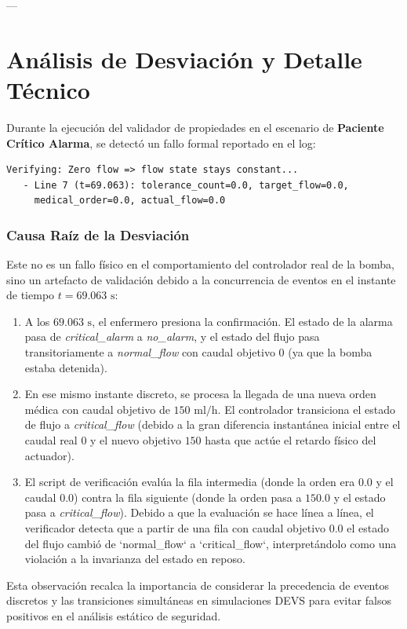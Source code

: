 \documentclass[11pt,a4paper]{article}
\begin{document}
---

\section{Análisis de Desviación y Detalle Técnico}
\label{sec:analisis_falla}
Durante la ejecución del validador de propiedades en el escenario de \textbf{Paciente Crítico Alarma}, se detectó un fallo formal reportado en el log:
\begin{verbatim}
Verifying: Zero flow => flow state stays constant...
   - Line 7 (t=69.063): tolerance_count=0.0, target_flow=0.0, 
     medical_order=0.0, actual_flow=0.0
\end{verbatim}

\subsubsection{Causa Raíz de la Desviación}
Este no es un fallo físico en el comportamiento del controlador real de la bomba, sino un artefacto de validación debido a la concurrencia de eventos en el instante de tiempo $t = 69.063\text{ s}$:
\begin{enumerate}
    \item A los $69.063\text{ s}$, el enfermero presiona la confirmación. El estado de la alarma pasa de \textit{critical\_alarm} a \textit{no\_alarm}, y el estado del flujo pasa transitoriamente a \textit{normal\_flow} con caudal objetivo $0$ (ya que la bomba estaba detenida).
    \item En ese mismo instante discreto, se procesa la llegada de una nueva orden médica con caudal objetivo de $150\text{ ml/h}$. El controlador transiciona el estado de flujo a \textit{critical\_flow} (debido a la gran diferencia instantánea inicial entre el caudal real $0$ y el nuevo objetivo $150$ hasta que actúe el retardo físico del actuador).
    \item El script de verificación evalúa la fila intermedia (donde la orden era $0.0$ y el caudal $0.0$) contra la fila siguiente (donde la orden pasa a $150.0$ y el estado pasa a \textit{critical\_flow}). Debido a que la evaluación se hace línea a línea, el verificador detecta que a partir de una fila con caudal objetivo $0.0$ el estado del flujo cambió de `normal\_flow` a `critical\_flow`, interpretándolo como una violación a la invarianza del estado en reposo.
\end{enumerate}
Esta observación recalca la importancia de considerar la precedencia de eventos discretos y las transiciones simultáneas en simulaciones DEVS para evitar falsos positivos en el análisis estático de seguridad.
\end{document}
